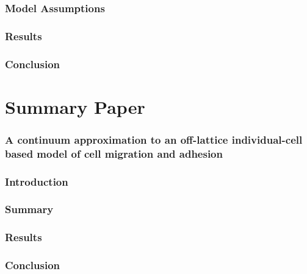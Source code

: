 \documentclass[12pt,letterpaper,cm]{article}
\renewcommand{\.}{\cdot}
\newcommand{\<}{\langle}
\renewcommand{\>}{\rangle}
\begin{document}
	
	
	
	
	\section*{Model Assumptions}
	
	
	
	\section*{Results}	
	
	
	
	\section*{Conclusion}
	
	
	
	\newpage
	
	
	
	
	\part*{Summary Paper}
	\section*{A continuum approximation to an off-lattice individual-cell based model of cell migration and adhesion \cite{Middleton2014} }
	
	
	
	\section*{Introduction}
	
	
	
	\section*{Summary}
	
	
	
	\section*{Results}	
	
	
	
	\section*{Conclusion}
	
	\printbibliography
	
	
	
\end{document}
